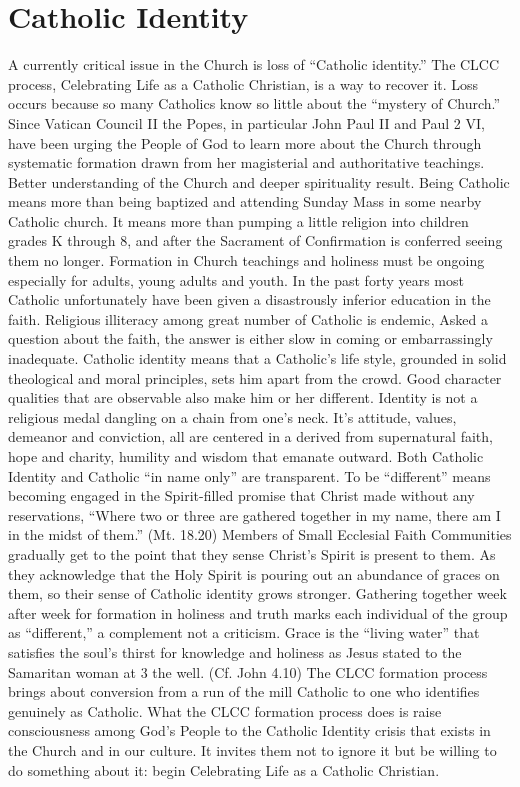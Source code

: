 \documentclass{article}
\begin{document}
\section{Catholic Identity}

A currently critical issue in the Church is loss of ``Catholic identity.'' The
CLCC process, Celebrating Life as a Catholic Christian, is a way to recover
it. Loss occurs because so many Catholics know so little about the ``mystery of
Church.'' Since Vatican Council II the Popes, in particular John Paul II and
Paul
2
VI, have been urging the People of God to learn more about the Church through
systematic formation drawn from her magisterial and authoritative
teachings. Better understanding of the Church and deeper spirituality result.
Being Catholic means more than being baptized and attending Sunday Mass in some
nearby Catholic church. It means more than pumping a little religion into
children grades K through 8, and after the Sacrament of Confirmation is
conferred seeing them no longer. Formation in Church teachings and holiness must
be ongoing especially for adults, young adults and youth. In the past forty
years most Catholic unfortunately have been given a disastrously inferior
education in the faith. Religious illiteracy among great number of Catholic is
endemic, Asked a question about the faith, the answer is either slow in coming
or embarrassingly inadequate.
Catholic identity means that a Catholic's life style, grounded in solid
theological and moral principles, sets him apart from the crowd. Good character
qualities that are observable also make him or her different. Identity is not a
religious medal dangling on a chain from one's neck. It's attitude, values,
demeanor and conviction, all are centered in a derived from supernatural faith,
hope and charity, humility and wisdom that emanate outward. Both Catholic
Identity and Catholic ``in name only'' are transparent.
To be ``different'' means becoming engaged in the Spirit-filled promise that
Christ made without any reservations, ``Where two or three are gathered together
in my name, there am I in the midst of them.'' (Mt. 18.20) Members of Small
Ecclesial Faith Communities gradually get to the point that they sense Christ's
Spirit is present to them. As they acknowledge that the Holy Spirit is pouring
out an abundance of graces on them, so their sense of Catholic identity grows
stronger. Gathering together week after week for formation in holiness and truth
marks each individual of the group as ``different,'' a complement not a
criticism.
Grace is the ``living water'' that satisfies the soul's thirst for knowledge and
holiness as Jesus stated to the Samaritan woman at
3
the well. (Cf. John 4.10) The CLCC formation process brings about conversion
from a run of the mill Catholic to one who identifies genuinely as
Catholic. What the CLCC formation process does is raise consciousness among
God's People to the Catholic Identity crisis that exists in the Church and in
our culture. It invites them not to ignore it but be willing to do something
about it: begin Celebrating Life as a Catholic Christian.
\end{document}
